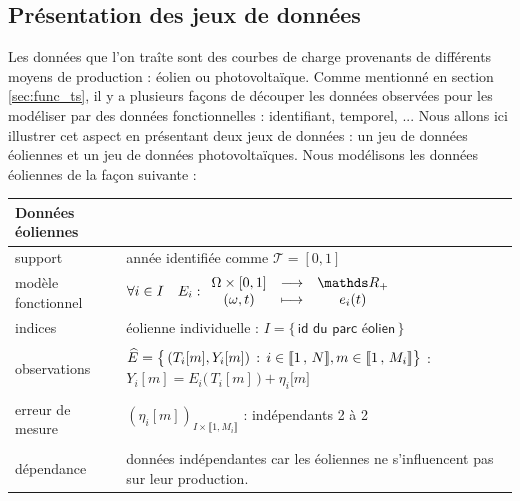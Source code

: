 \subsection{Présentation des jeux de données}

Les données que l'on traîte sont des courbes de charge provenants de différents moyens de production : éolien ou photovoltaïque. Comme mentionné en section \ref{sec:func_ts}, il y a plusieurs façons de découper les données observées pour les modéliser par des données fonctionnelles : identifiant, temporel, ... Nous allons ici illustrer cet aspect en présentant deux jeux de données : un jeu de données éoliennes et un jeu de données photovoltaïques. Nous modélisons les données éoliennes de la façon suivante :

\bigskip

\noalign\begin{tabularx}{\textwidth}{XX}
	\toprule
	\textbf{Données éoliennes}                                                                                                                                                                              \\
	\midrule
	support            & année identifiée comme $\mathcal T = [0,1]$                                                                                                                                        \\
	modèle fonctionnel & $\forall i \in I \quad E_i : \func {\Omega \times [0,1]} {\mathds R_+} {(\omega, t)} {e_i(t)}$                                                                                     \\
	indices            & éolienne individuelle : $I = \bigl\{ \, \textsf{id du parc éolien} \,\bigr\}$                                                                                                      \\
	\\
	observations       & $\widehat E = \bigl\{ \, (T_i[m], Y_i[m]) \, : \, i \in \llbracket 1 \, , \, N \rrbracket, m \in \llbracket 1 \, , \, M_i \rrbracket \bigr\}$ : $Y_i[m] = E_i\bigl( \, T_i[m] \, \bigr) + \eta_i\bigl[ m \bigr]$ \\
	\\
	erreur de mesure   & $(\eta_i[m])_{I\times\llbracket 1, M_i \rrbracket}$ : indépendants 2 à 2                                                                                                           \\
	\\
	dépendance         & données indépendantes car les éoliennes ne s'influencent pas sur leur production.                                                                                                  \\
	\bottomrule
\end{tabularx}


